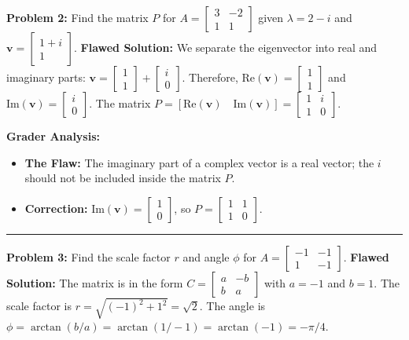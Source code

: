 \documentclass[11pt, letterpaper]{article}
\theoremstyle{definition}
\theoremstyle{remark}
\begin{document}
\textbf{Problem 2:} Find the matrix $P$ for $A = \begin{bmatrix} 3 & -2 \\ 1 & 1 \end{bmatrix}$ given $\lambda = 2 - i$ and $\mathbf{v} = \begin{bmatrix} 1 + i \\ 1 \end{bmatrix}$.
\newline
\textbf{Flawed Solution:}
We separate the eigenvector into real and imaginary parts:
$\mathbf{v} = \begin{bmatrix} 1 \\ 1 \end{bmatrix} + \begin{bmatrix} i \\ 0 \end{bmatrix}$.
Therefore, $\text{Re}(\mathbf{v}) = \begin{bmatrix} 1 \\ 1 \end{bmatrix}$ and $\text{Im}(\mathbf{v}) = \begin{bmatrix} i \\ 0 \end{bmatrix}$.
The matrix $P = [\text{Re}(\mathbf{v}) \quad \text{Im}(\mathbf{v})] = \begin{bmatrix} 1 & i \\ 1 & 0 \end{bmatrix}$.

\textbf{Grader Analysis:}
\begin{itemize}
    \item \textbf{The Flaw:} The imaginary part of a complex vector is a real vector; the $i$ should not be included inside the matrix $P$.
    \item \textbf{Correction:} $\text{Im}(\mathbf{v}) = \begin{bmatrix} 1 \\ 0 \end{bmatrix}$, so $P = \begin{bmatrix} 1 & 1 \\ 1 & 0 \end{bmatrix}$.
\end{itemize}

\vspace{1em}
\hrule
\vspace{1em}

\textbf{Problem 3:} Find the scale factor $r$ and angle $\phi$ for $A = \begin{bmatrix} -1 & -1 \\ 1 & -1 \end{bmatrix}$.
\newline
\textbf{Flawed Solution:}
The matrix is in the form $C = \begin{bmatrix} a & -b \\ b & a \end{bmatrix}$ with $a = -1$ and $b = 1$.
The scale factor is $r = \sqrt{(-1)^2 + 1^2} = \sqrt{2}$.
The angle is $\phi = \arctan(b/a) = \arctan(1/-1) = \arctan(-1) = -\pi/4$.
\end{document}
